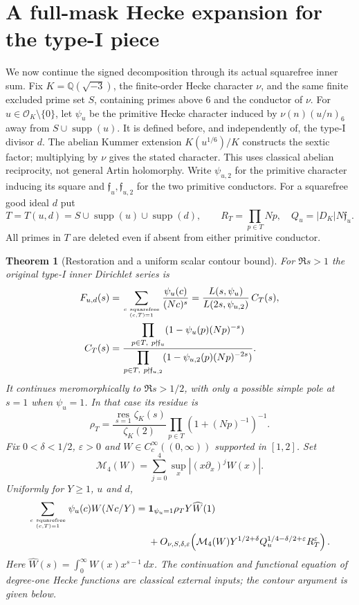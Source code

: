 \documentclass[11pt]{article}
\newtheorem{theorem}{Theorem}[section]
\theoremstyle{definition}\newtheorem{definition}[theorem]{Definition}
\theoremstyle{remark}\newtheorem{remark}[theorem]{Remark}
\begin{document}
\section{A full-mask Hecke expansion for the type-I piece}
\label{hti:core}
We now continue the signed decomposition through its actual squarefree
inner sum. Fix $K=\mathbb Q(\sqrt{-3})$, the finite-order Hecke character
$\nu$, and the same finite excluded prime set $S$, containing primes above
$6$ and the conductor of $\nu$. For $u\in\mathcal O_K\setminus\{0\}$,
let $\psi_u$ be the primitive Hecke character induced by
$\nu(n)(u/n)_6$ away from $S\cup\operatorname{supp}(u)$.
It is defined before, and independently of, the type-I divisor $d$.
The abelian Kummer extension $K(u^{1/6})/K$ constructs the sextic
factor; multiplying by $\nu$ gives the stated character.
This uses classical abelian reciprocity, not general Artin holomorphy.
Write $\psi_{u,2}$ for the primitive character inducing its square and
$\mathfrak f_u,\mathfrak f_{u,2}$ for the two primitive conductors.
For a squarefree good ideal $d$ put
\[
 T=T(u,d)=S\cup\operatorname{supp}(u)\cup\operatorname{supp}(d),\qquad
 R_T=\prod_{p\in T}Np,\quad Q_u=|D_K|N\mathfrak f_u.
\]
All primes in $T$ are deleted even if absent from either primitive conductor.

\begin{theorem}[Restoration and a uniform scalar contour bound]
\label{hti:theorem}
For $\Re s>1$ the original type-I inner Dirichlet series is
\begin{align}
 F_{u,d}(s)
 &=\sum_{c\ {\rm squarefree}\atop(c,T)=1}
       \frac{\psi_u(c)}{(Nc)^s}
   =\frac{L(s,\psi_u)}{L(2s,\psi_{u,2})}\,C_T(s),\label{hti:ratio}\\
 C_T(s)
 &=\frac{\displaystyle\prod_{p\in T,\ p\nmid\mathfrak f_u}
             (1-\psi_u(p)(Np)^{-s})}
          {\displaystyle\prod_{p\in T,\ p\nmid\mathfrak f_{u,2}}
             (1-\psi_{u,2}(p)(Np)^{-2s})}.
 \label{hti:restore}
\end{align}
It continues meromorphically to $\Re s>1/2$, with only a possible
simple pole at $s=1$ when $\psi_u=1$. In that case its residue is
\[
 \rho_T=\frac{\operatorname*{res}_{s=1}\zeta_K(s)}{\zeta_K(2)}
             \prod_{p\in T}(1+(Np)^{-1})^{-1}.
\]
Fix $0<\delta<1/2$, $\varepsilon>0$ and
$W\in C_c^\infty((0,\infty))$ supported in $[1,2]$. Set
\[\mathcal M_4(W)=\sum_{j=0}^4\sup_x|(x\partial_x)^jW(x)|.\]
Uniformly for $Y\ge1$, $u$ and $d$,
\begin{align}
 \sum_{c\ {\rm squarefree}\atop(c,T)=1}\psi_u(c)W(Nc/Y)
 ={}&\mathbf1_{\psi_u=1}\rho_TY\widehat W(1)\notag\\
 &+O_{\nu,S,\delta,\varepsilon}\!\left(
 \mathcal M_4(W)Y^{1/2+\delta}
 Q_u^{1/4-\delta/2+\varepsilon}R_T^\varepsilon\right).
 \label{hti:scalar}
\end{align}
Here $\widehat W(s)=\int_0^\infty W(x)x^{s-1}\,dx$.
The continuation and functional equation of degree-one Hecke functions
are classical external inputs; the contour argument is given below.
\end{theorem}
\end{document}

